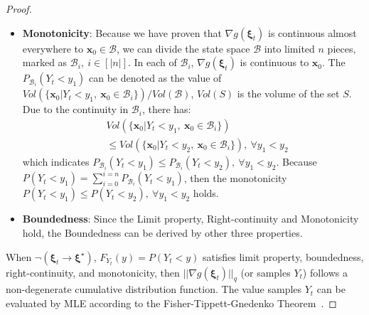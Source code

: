 \documentclass[conference]{IEEEtran}
\newtheorem{proof}{\bf Proof}
\newcommand{\mle}{\textsc{MLE}\xspace}
\newcommand{\myvec}[1]{\boldsymbol{#1}}
\newcommand{\calB}{\mathcal{B}}
\begin{document}
\begin{proof}
\begin{itemize}

    \item \textbf{Monotonicity}: 
    Because we have proven that $\nabla g(\myvec{\xi}_{t})$ is 
    continuous almost everywhere to $\myvec{x}_{0} \in \calB$, we can 
    divide the state space $\calB$ into limited $n$ pieces, marked as 
    $\calB_{i},\ i \in [|n|]$. In each of $\calB_{i}$, $\nabla g(\myvec{\xi}_{t})$ 
    is continuous to $\myvec{x}_{0}$. 
    The $P_{\calB_{i}}( Y_{t} < y_{1} )$ can be denoted as the value of 
    $Vol( \{ \myvec{x}_{0}| Y_{t} < y_{1},\ \myvec{x}_{0} \in \calB_{i} \} ) 
    / Vol(\calB)$, $Vol(S)$ is the volume of the set $S$. 
    Due to the continuity in $\calB_{i}$, there has: 
    \begin{equation}\label{eq:monotonicity 1}
        \begin{aligned}
            &Vol( \{ \myvec{x}_{0}| Y_{t} < y_{1},\ \myvec{x}_{0} \in \calB_{i} \} ) \\
            & \leq Vol( \{ \myvec{x}_{0}| Y_{t} < y_{2},\ \myvec{x}_{0} \in \calB_{i} \} ), \ \forall y_{1}<y_{2}
        \end{aligned}
    \end{equation}
    which indicates $P_{\calB_{i}}( Y_{t} < y_{1}) \leq 
    P_{\calB_{i}}( Y_{t} < y_{2}), 
    \ \forall y_{1}<y_{2}$. 
    Because $P( Y_{t} < y_{1}) = \sum_{i = 0}^{i = n}P_{\calB_{i}}( Y_{t} < y_{1})$, 
    then the monotonicity $P( Y_{t} < y_{1}) \leq P( Y_{t} < y_{2}), 
    \ \forall y_{1}<y_{2}$ holds. 
    \item \textbf{Boundedness}: 
    Since the Limit property, Right-continuity and Monotonicity hold, 
    the Boundedness can be derived by other three properties. 
  \end{itemize}

  When $\lnot(\myvec{\xi}_{t} \to \myvec{\xi}^{\star})$, 
  $F_{Y_{t}}(y) = P(Y_{t} < y)$ 
  satisfies  limit property, 
  boundedness, right-continuity, and
  monotonicity, then
  $||\nabla g(\myvec{\xi}_{t})||_{q}$ (or samples $Y_{t}$)
  follows a non-degenerate cumulative distribution function. 
  The value samples $Y_{t}$ can be evaluated by \mle 
  according to the Fisher-Tippett-Gnedenko Theorem~\cite{smith1990extreme}. 


\end{proof}
\end{document}
